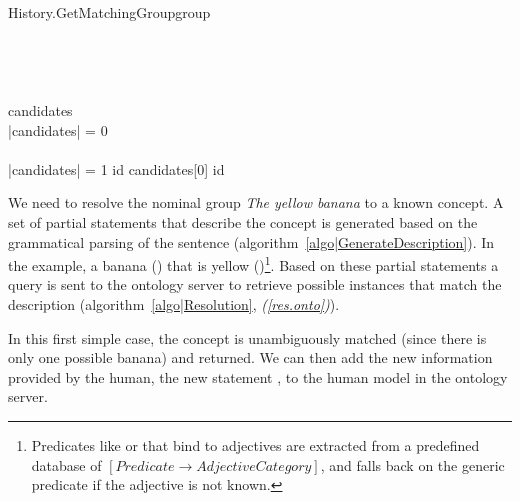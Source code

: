 \small
\begin{pseudocode}[ruled]{History.GetMatchingGroup}{group}
\label{algo|History}
\\
 \GETS {}\\
 \\
 \\
	 \GETS {} \\ 
	
	candidates \GETS {} \cap {}\\
	\IF \left|{candidates}\right| = 0 \THEN
    \BEGIN
       \\
      \EXIT \\
    \END
   \ELSEIF \left|{candidates}\right| = 1 \THEN
      id \GETS candidates[0]
   \ELSE
   	  id \GETS {}\\
\ENDPROCEDURE
\end{pseudocode}
\normalsize

We need to resolve the nominal group \emph{The yellow banana} to a known
concept.  A set of partial statements that describe the
concept is generated based on the grammatical parsing of the sentence
(algorithm~\ref{algo|GenerateDescription}). In the example, a banana
() that is yellow ()\footnote{Predicates like  or  that
bind  to adjectives are extracted from a predefined
database of $[Predicate \rightarrow AdjectiveCategory]$, and falls back on the
generic  predicate if the adjective is not known.}.  Based
on these partial statements a query is sent to the ontology server to retrieve
possible instances that match the description (algorithm~\ref{algo|Resolution},
\emph{(\ref{res.onto})}).

In this first simple case, the concept  is unambiguously
matched (since there is only one possible banana) and returned. We can then add
the new information provided by the human, \ie the new statement
, to the human model in the ontology
server.

